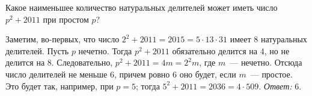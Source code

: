 Какое наименьшее количество натуральных делителей может иметь число
$p^2 + 2011$ при простом $p$?

\solution
Заметим, во-первых, что число
$2^2 + 2011 = 2015 = 5 \cdot 13 \cdot 31$
имеет $8$ натуральных делителей.
Пусть $p$ нечетно.
Тогда $p^2 + 2011$ обязательно делится на $4$, но не делится на $8$.
Следовательно, $p^2 + 2011 = 4 m = 2^2 m$, где $m$~--- нечетно.
Отсюда число делителей не меньше $6$, причем ровно $6$ оно будет, если
$m$~--- простое.
Это будет так, например, при $p = 5$; тогда $5^2 + 2011 = 2036 = 4 \cdot 509$.
\emph{Ответ:}
$6$.

